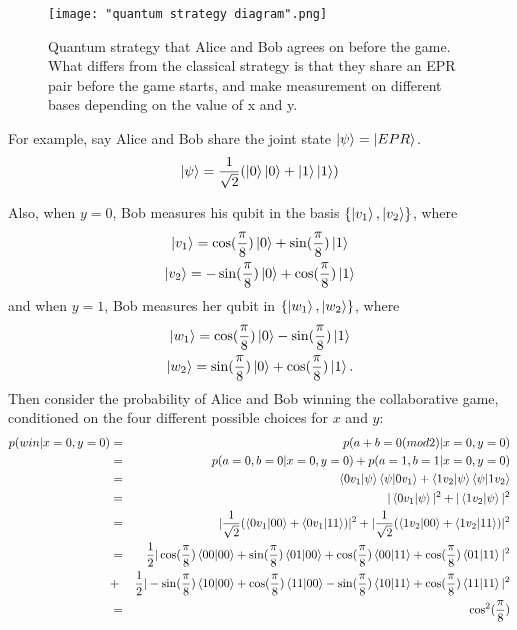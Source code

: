 
\begin{figure}[h]
 \centering
    \texttt{[image: "quantum strategy diagram".png]}
    \caption{Quantum strategy that Alice and Bob agrees on before the game. What differs from the classical strategy is that they share an EPR pair before the game starts, and make measurement on different bases depending on the value of x and y.}
    \label{fig: quantum strategy diagram}
\end{figure}

For example, say Alice and Bob share the joint state $\ket{\psi}=\ket{EPR}$. 
\begin{equation*}
    \ket{\psi}=\frac{1}{\sqrt{2}}(\ket{0} \ket{0}+\ket{1} \ket{1})
\end{equation*}

Also, when $y=0$, Bob measures his qubit in the basis $\{\ket{v_1}, \ket{v_2}\}$, where
\begin{gather*}
    \ket{v_1}=\cos(\frac{\pi}{8})\ket{0}+\sin(\frac{\pi}{8})\ket{1}\\
    \ket{v_2}=-\sin(\frac{\pi}{8})\ket{0}+\cos(\frac{\pi}{8})\ket{1}  
\end{gather*}
and when $y = 1$, Bob measures her qubit in $\{\ket{w_1}, \ket{w_2}\}$, where
\begin{gather*}
    \ket{w_1}=\cos(\frac{\pi}{8})\ket{0}-\sin(\frac{\pi}{8})\ket{1}\\
    \ket{w_2}=\sin(\frac{\pi}{8})\ket{0}+\cos(\frac{\pi}{8})\ket{1}.
    \end{gather*}
Then consider the probability of Alice and Bob winning the collaborative game, conditioned on the four different possible choices for $x$ and $y$:
\begin{eqnarray*}
p(win|x=0,y=0)&=&p(a+b=0(mod 2)|x=0,y=0)\\
&=&p(a=0, b=0|x=0, y=0)+p(a=1, b=1|x=0, y=0)\\
&=&\braket{0 v_1|\psi}\braket{\psi|0v_1}+\braket{1 v_2|\psi}\braket{\psi|1v_2}\\
&=&|\braket{0 v_1|\psi}|^2 + |\braket{1 v_2|\psi}|^2\\
&=&|\frac{1}{\sqrt{2}}(\braket{0v_1|00}+\braket{0v_1|11})|^2+|\frac{1}{\sqrt{2}}(\braket{1v_2|00}+\braket{1v_2|11})|^2\\
&=&\frac{1}{2}|\cos(\frac{\pi}{8})\braket{00|00}+\sin(\frac{\pi}{8})\braket{01|00}+\cos(\frac{\pi}{8})\braket{00|11}+\cos(\frac{\pi}{8})\braket{01|11}|^2\\
&+&\frac{1}{2}|-\sin(\frac{\pi}{8})\braket{10|00}+\cos(\frac{\pi}{8})\braket{11|00}-\sin(\frac{\pi}{8})\braket{10|11}+\cos(\frac{\pi}{8})\braket{11|11}|^2\\
&=&\cos^2(\frac{\pi}{8})
\end{eqnarray*}

